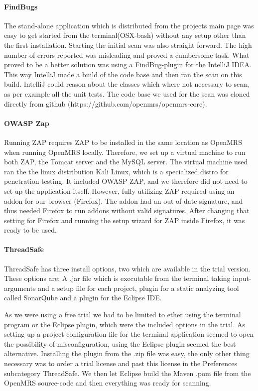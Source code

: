 \documentclass{report} %
\begin{document}
\paragraph{FindBugs}

The stand-alone application which is distributed from the projects main page was
easy to get started from the terminal(OSX-bash) without any setup other than the
first installation. Starting the initial scan was also straight forward. The
high number of errors reported was misleading and proved a cumbersome task. What
proved to be a better solution was using a FindBug-plugin for the IntelliJ IDEA.
This way IntelliJ made a build of the code base and then ran the scan on this
build. IntelliJ could reason about the classes which where not necessary
to scan, as per example all the unit tests. The code base we used for the scan was
cloned directly from github (https://github.com/openmrs/openmrs-core).

\paragraph{OWASP Zap}

Running ZAP requires ZAP to be installed in the same location as OpenMRS when
running OpenMRS locally. Therefore, we set up a virtual machine to run both ZAP,
the Tomcat server and the MySQL server. The virtual machine used ran the the
linux distribution Kali Linux, which is a specialized distro for penetration
testing. It included OWASP ZAP, and we therefore did not need to set up the
application itself. However, fully utilizing ZAP required using an addon for our
browser (Firefox). The addon had an out-of-date signature, and thus needed
Firefox to run addons without valid signatures. After changing that setting for
Firefox and running the setup wizard for ZAP inside Firefox, it was ready to be used.

\paragraph{ThreadSafe} %

ThreadSafe has three install options, two which are available in the trial
version. These options are: A .jar file which is executable from the terminal
taking input-arguments and a setup file for each project, plugin for a static
analyzing tool called SonarQube and a plugin for the Eclipse IDE.

As we were using a free trial we had to be limited to ether using the terminal
program or the Eclipse plugin, which were the included options in the trial. As
setting up a project configuration file for the terminal application seemed to
open the possibility of misconfiguration, using the Eclipse plugin seemed the
best alternative. Installing the plugin from the .zip file was easy, the only
other thing necessary was to order a trial license and past this license in the
Preferences subcategory ThreadSafe. We then let Eclipse build the Maven .pom file from
the OpenMRS source-code and then everything was ready for scanning. 
\end{document}
